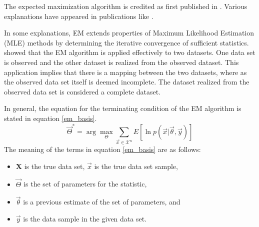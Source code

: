 \documentclass[]{article}
\begin{document}
The expected maximization algorithm is credited as first published in \cite{Dempster77maximumlikelihood}.  Various explanations have appeared in publications like \cite{duda-hart-stork,Moon96theexpectation-maximization, Joo_expectationmaximization}.    

In some explanations, EM extends properties of Maximum Likelihood Estimation (MLE) methods by determining the iterative convergence of sufficient statistics.
\cite{Dempster77maximumlikelihood} showed that the EM algorithm is applied effectively to two datasets.  One data set is observed and the other dataset is realized from the observed dataset.  This application implies that there is a mapping between the two datasets, where as the observed data set itself is deemed incomplete.   The dataset realized from the observed data set is considered a complete dataset.  

In general, the equation for the terminating condition of the EM algorithm \cite{duda-hart-stork} is stated in equation \ref{em_basis}.  
\begin{equation}
\vec{\Theta}^* = \arg \max_{\Theta} \sum_{\vec{x}\in \mathcal{X}^n} E[ \ln p( \vec{x} | \vec{\theta} ,\vec{y}) ] \label{em_basis}
\end{equation}
The meaning of the terms in equation \ref{em_basis} are as follows:

\begin{itemize}
\item  $\mathbf{X}$ is the true data set, $\vec{x}$ is the true data set sample, 
 \item $\vec{\Theta}$ is the set of parameters for the statistic, 
	\item $\vec{\theta}$ is a previous estimate of the set of parameters,  and 
 \item $\vec{y}$ is the data sample in the given data set.
 \end{itemize}
\end{document}
